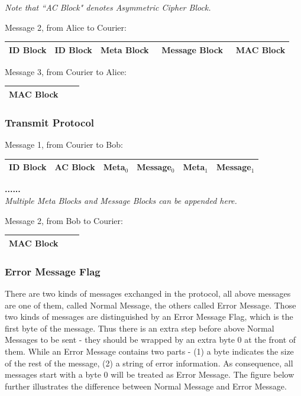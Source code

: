 \noindent\bigskip
\textit{Note that ``AC Block" denotes Asymmetric Cipher Block.}

\noindent
Message 2, from Alice to Courier: \\\bigskip
\begin{tabular}{|c|c|c|c|c|}
 \hline
 ID Block & ID Block & \qquad\; Meta Block \qquad\; & 
 \quad\, Message Block \quad\, & MAC Block \\ \hline
\end{tabular}

\noindent
Message 3, from Courier to Alice: \\\bigskip
\begin{tabular}{|c|c|c|}
 \hline
 MAC Block \\ \hline
\end{tabular}

\subsubsection*{Transmit Protocol}
Message 1, from Courier to Bob: \\
\begin{tabular}{|c|c|c|c|c|c|}
 \hline
 ID Block & \qquad\; AC Block \qquad\; & 
 \; Meta$_0$ \; & Message$_0$ & 
 \; Meta$_1$ \; & Message$_1$
 \\ \hline
\end{tabular}
\textbf{......} \\
\noindent\bigskip
\textit{Multiple Meta Blocks and Message Blocks can be appended here.}

\noindent
Message 2, from Bob to Courier: \\\bigskip
\begin{tabular}{|c|c|c|}
 \hline
 MAC Block \\ \hline
\end{tabular}

\subsubsection*{Error Message Flag}
There are two kinds of messages exchanged in the protocol, all above messages are one of them, called Normal Message, the others called Error Message. Those two kinds of messages are distinguished by an Error Message Flag, which is the first byte of the message. Thus there is an extra step before above Normal Messages to be sent - they should be wrapped by an extra byte 0 at the front of them. While an Error Message contains two parts - (1) a byte indicates the size of the rest of the message, (2) a string of error information. As consequence, all messages start with a byte 0 will be treated as Error Message. The figure below further illustrates the difference between Normal Message and Error Message.

